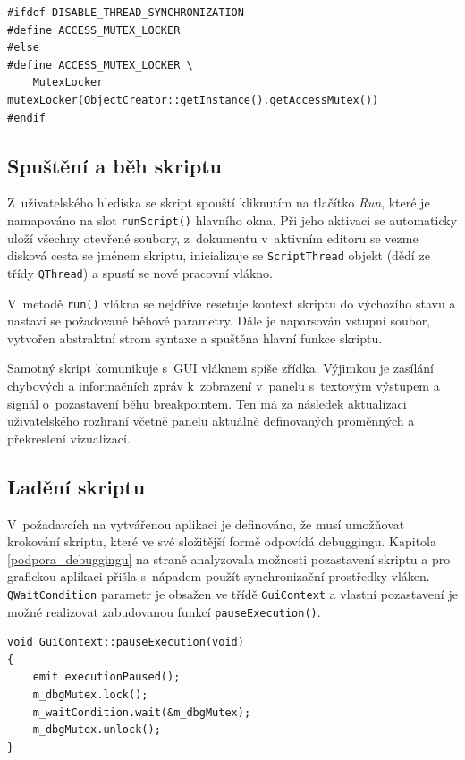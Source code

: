 \documentclass[11pt,twoside,a4paper]{book}
\begin{document}
\begin{verbatim}
#ifdef DISABLE_THREAD_SYNCHRONIZATION
#define ACCESS_MUTEX_LOCKER
#else
#define ACCESS_MUTEX_LOCKER \
    MutexLocker mutexLocker(ObjectCreator::getInstance().getAccessMutex())
#endif
\end{verbatim}


\subsection{Spuštění a běh skriptu}

Z~uživatelského hlediska se skript spouští kliknutím na tlačítko \textit{Run}, které je namapováno na slot \texttt{runScript()} hlavního okna. Při jeho aktivaci se automaticky uloží všechny otevřené soubory, z~dokumentu v~aktivním editoru se vezme disková cesta se jménem skriptu, inicializuje se \texttt{ScriptThread} objekt (dědí ze třídy \texttt{QThread}) a spustí se nové pracovní vlákno.

V~metodě \texttt{run()} vlákna se nejdříve resetuje kontext skriptu do výchozího stavu a nastaví se požadované běhové parametry. Dále je naparsován vstupní soubor, vytvořen abstraktní strom syntaxe a spuštěna hlavní funkce skriptu.

Samotný skript komunikuje s~GUI vláknem spíše zřídka. Výjimkou je zasílání chybových a informačních zpráv k~zobrazení v~panelu s~textovým výstupem a signál o~pozastavení běhu breakpointem. Ten má za následek aktualizaci uživatelského rozhraní včetně panelu aktuálně definovaných proměnných a překreslení vizualizací.


\subsection{Ladění skriptu}

V~požadavcích na vytvářenou aplikaci je definováno, že musí umožňovat krokování skriptu, které ve své složitější formě odpovídá debuggingu. Kapitola \ref{podpora_debuggingu} na straně \pageref{podpora_debuggingu} analyzovala možnosti pozastavení skriptu a pro grafickou aplikaci přišla s~nápadem použít synchronizační prostředky vláken. \texttt{QWaitCondition} parametr je obsažen ve třídě \texttt{GuiContext} a vlastní pozastavení je možné realizovat zabudovanou funkcí \texttt{pauseExecution()}.

\begin{verbatim}
void GuiContext::pauseExecution(void)
{
    emit executionPaused();
    m_dbgMutex.lock();
    m_waitCondition.wait(&m_dbgMutex);
    m_dbgMutex.unlock();
}
\end{verbatim}
\end{document}

